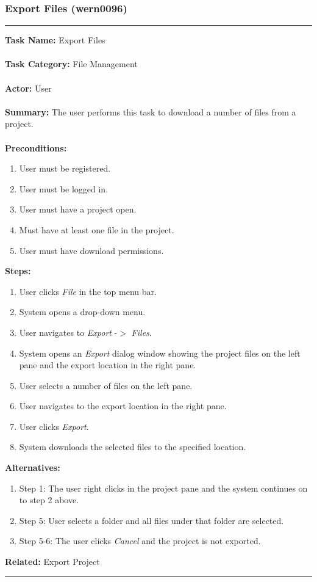 \documentclass[11pt]{report}
\begin{document}
\newpage

\subsubsection{Export Files (wern0096)}
\vspace{2pt}
\hrule
\vspace{8pt}
	\noindent\textbf{Task Name:} Export Files \\ \\
	\textbf{Task Category:} File Management \\ \\
	\textbf{Actor:} User \\ \\
	\textbf{Summary:} The user performs this task to download a number of files from a project. \\ \\
	\textbf{Preconditions:} 
	\begin{enumerate}
		\item User must be registered.
		\item User must be logged in.
		\item User must have a project open.
		\item Must have at least one file in the project.
		\item User must have download permissions.
	\end{enumerate}
	\textbf{Steps:}
	\begin{enumerate}
		\item User clicks \textit{File} in the top menu bar.
		\item System opens a drop-down menu.
		\item User navigates to \textit{Export} -$>$ \textit{Files}.
		\item System opens an \textit{Export} dialog window showing the project files on the left pane and the export location in the right pane.
		\item User selects a number of files on the left pane.
		\item User navigates to the export location in the right pane.
		\item User clicks \textit{Export}.
		\item System downloads the selected files to the specified location.
	\end{enumerate}
	\textbf{Alternatives:} 
	\begin{enumerate}
		\item Step 1: The user right clicks in the project pane and the system continues on to step 2 above.
		\item Step 5: User selects a folder and all files under that folder are selected.
		\item Step 5-6: The user clicks \textit{Cancel} and the project is not exported.
	\end{enumerate}
	\textbf{Related:} Export Project
\hrule
\vspace{8pt}
\end{document}
